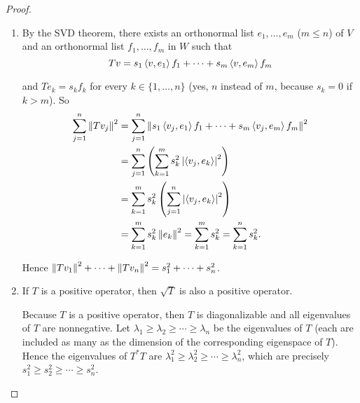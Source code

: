 \begin{proof}
    \begin{enumerate}[label={(\alph*)}]
        \item By the SVD theorem, there exists an orthonormal list $e_{1}, \ldots, e_{m}$ ($m\leq n$) of $V$ and an orthonormal list $f_{1}, \ldots, f_{m}$ in $W$ such that
              \[
                  Tv = s_{1}\left\langle{v,e_{1}}\right\rangle f_{1} + \cdots + s_{m}\left\langle{v, e_{m}}\right\rangle f_{m}
              \]

              and $Te_{k} = s_{k}f_{k}$ for every $k\in\{1,\ldots,n\}$ (yes, $n$ instead of $m$, because $s_{k} = 0$ if $k > m$). So
              \begin{align*}
                  \sum^{n}_{j=1}\left\Vert{Tv_{j}}\right\Vert^{2} & = \sum^{n}_{j=1}\left\Vert{s_{1}\left\langle{v_{j}, e_{1}}\right\rangle f_{1} + \cdots + s_{m}\left\langle{v_{j}, e_{m}}\right\rangle f_{m}}\right\Vert^{2} \\
                                                  & = \sum^{n}_{j=1}\left(\sum^{m}_{k=1}s_{k}^{2}\left\vert{\left\langle{v_{j}, e_{k}}\right\rangle}\right\vert^{2}\right)                      \\
                                                  & = \sum^{m}_{k=1}s_{k}^{2}\left(\sum^{n}_{j=1}\left\vert{\left\langle{v_{j}, e_{k}}\right\rangle}\right\vert^{2}\right)                      \\
                                                  & = \sum^{m}_{k=1}s_{k}^{2}\left\Vert{e_{k}}\right\Vert^{2} = \sum^{m}_{k=1}s_{k}^{2} = \sum^{n}_{k=1}s_{k}^{2}.
              \end{align*}

              Hence $\left\Vert{Tv_{1}}\right\Vert^{2} + \cdots + \left\Vert{Tv_{n}}\right\Vert^{2} = s_{1}^{2} + \cdots + s_{n}^{2}$.
        \item If $T$ is a positive operator, then $\sqrt{T}$ is also a positive operator.

              Because $T$ is a positive operator, then $T$ is diagonalizable and all eigenvalues of $T$ are nonnegative. Let $\lambda_{1}\geq\lambda_{2}\geq\cdots\geq\lambda_{n}$ be the eigenvalues of $T$ (each are included as many as the dimension of the corresponding eigenspace of $T$). Hence the eigenvalues of $T^{*}T$ are $\lambda_{1}^{2}\geq\lambda_{2}^{2}\geq\cdots\geq \lambda_{n}^{2}$, which are precisely $s_{1}^{2}\geq s_{2}^{2}\geq\cdots\geq s_{n}^{2}$.


\end{enumerate}
\end{proof}

